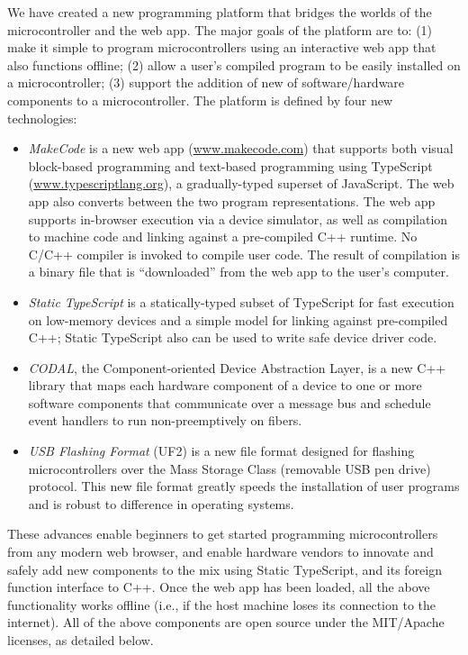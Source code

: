 We have created a new programming platform that bridges the worlds of the microcontroller
and the web app. The major goals of the platform are to: (1)
make it simple to program microcontrollers using an interactive web app that also functions offline;
(2) allow a user's compiled program to be easily installed on a microcontroller;
(3) support the addition of new of software/hardware components to a microcontroller.
The platform is defined by four new technologies:
\begin{itemize}
      
\item 
\emph{MakeCode} is a new web app (\url{www.makecode.com}) that supports 
both visual block-based programming and text-based programming using TypeScript (\url{www.typescriptlang.org}), 
a gradually-typed superset of JavaScript. 
The web app also converts between the two program representations. The web app supports in-browser execution 
via a device simulator, as well as compilation to machine code and linking against a 
pre-compiled C++ runtime. No C/C++ compiler is invoked to compile user code. 
The result of compilation is a binary file that is ``downloaded'' from the web app to the user's computer. 

\item \emph{Static TypeScript} is a statically-typed subset of TypeScript for fast execution on low-memory devices 
and a simple model for linking against pre-compiled C++; Static TypeScript also can be used to write safe 
device driver code.

\item \emph{CODAL}, the Component-oriented Device Abstraction Layer, is a new C++ library that maps 
each hardware component of a device to one or more software components that communicate over a message bus and
schedule event handlers to run non-preemptively on fibers. 

\item \emph{USB Flashing Format} (UF2) is a new file format designed for flashing microcontrollers over the Mass Storage
Class (removable USB pen drive) protocol.  This new file format greatly speeds the installation of user programs
and is robust to difference in operating systems.
\end{itemize}
These advances enable beginners to get started programming microcontrollers from any modern web browser, and enable
hardware vendors to innovate and safely add new components to the mix using Static TypeScript, and its
foreign function interface to C++. Once the web app has been loaded, 
all the above functionality works offline (i.e., if the host machine loses its connection 
to the internet).
All of the above components are open source under the MIT/Apache licenses, as detailed below. 

